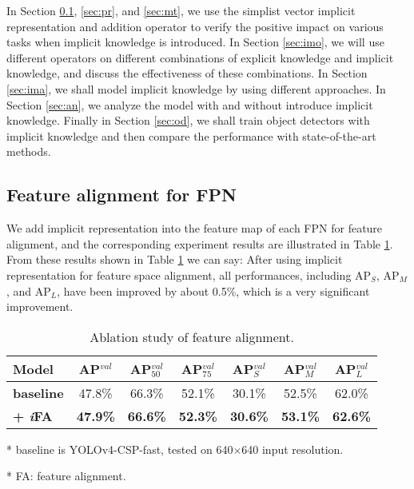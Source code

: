 \documentclass[10pt,twocolumn,letterpaper]{article}
\begin{document}
In Section \ref{sec:fa}, \ref{sec:pr}, and \ref{sec:mt}, we use the simplist vector implicit representation and addition operator to verify the positive impact on various tasks when implicit knowledge is introduced. In Section \ref{sec:imo}, we will use different operators on different combinations of explicit knowledge and implicit knowledge, and discuss the effectiveness of these combinations. In Section \ref{sec:ima}, we shall model implicit knowledge by using different approaches. In Section \ref{sec:an}, we analyze the model with and without introduce implicit knowledge. Finally in Section \ref{sec:od}, we shall train object detectors with implicit knowledge and then compare the performance with state-of-the-art methods.

\newpage

\subsection{Feature alignment for FPN}
\label{sec:fa}

We add implicit representation into the feature map of each FPN for feature alignment, and the corresponding experiment results are illustrated in Table \ref{table:e1}. From these results shown in Table \ref{table:e1} we can say: After using implicit representation for feature space alignment, all performances, including AP$_{S}$, AP$_{M}$, and AP$_{L}$, have been improved by about 0.5\%, which is a very significant improvement.

\begin{table}[h]
	\centering
	\begin{threeparttable}[h]
		\footnotesize
		\caption{Ablation study of feature alignment.}
		\label{table:e1}
		\setlength\tabcolsep{4.5pt}
		\begin{tabular}{lcccccc}
			\toprule
			\textbf{Model} & \textbf{AP$^{val}$} & \textbf{AP$^{val}_{50}$} & \textbf{AP$^{val}_{75}$} & \textbf{AP$^{val}_{S}$} & \textbf{AP$^{val}_{M}$} & \textbf{AP$^{val}_{L}$} \\				
			\midrule
			\textbf{baseline} & 47.8\% & 66.3\% & 52.1\% & 30.1\% & 52.5\% & 62.0\% \\
			\textbf{+ \textit{i}FA} & \textbf{47.9\%} & \textbf{66.6\%} & \textbf{52.3\%} & \textbf{30.6\%} & \textbf{53.1\%} & \textbf{62.6\%} \\
			\bottomrule
		\end{tabular}
		\begin{tablenotes}[flushleft]
			\footnotesize
			\item[*] baseline is YOLOv4-CSP-fast, tested on 640$\times$640 input resolution.
			\item[*] FA: feature alignment.
		\end{tablenotes}
	\end{threeparttable}
\end{table}
\end{document}
